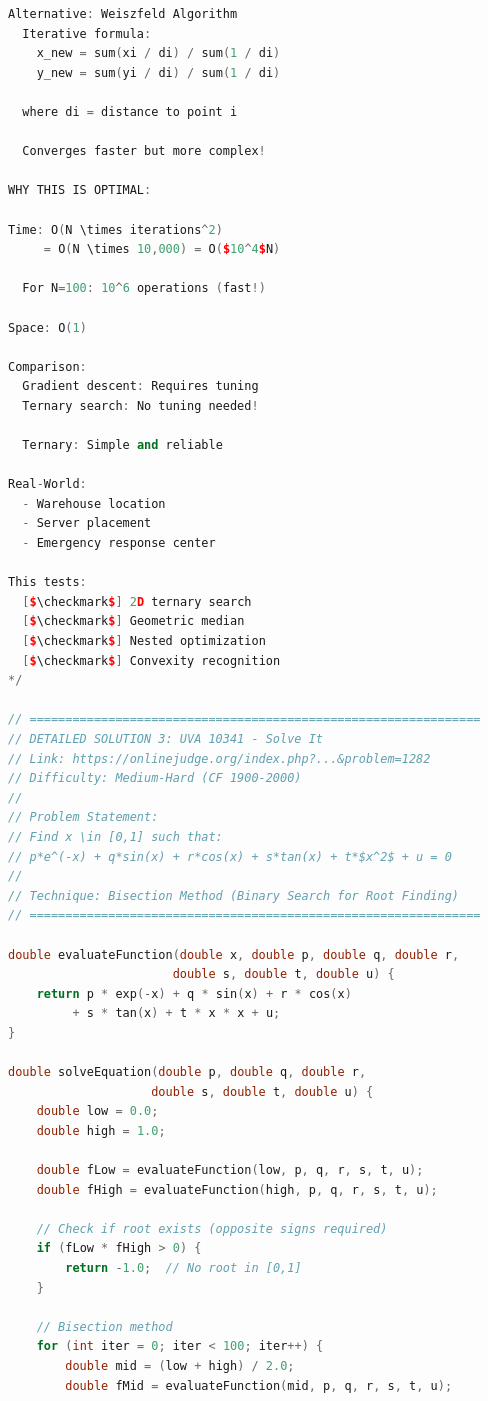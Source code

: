 \documentclass[11pt,a4paper,oneside]{book}
\begin{document}
\begin{lstlisting}[language=C++, caption=COMPLETE Coordinate BS Solutions - DETAILED]
Alternative: Weiszfeld Algorithm
  Iterative formula:
    x_new = sum(xi / di) / sum(1 / di)
    y_new = sum(yi / di) / sum(1 / di)
  
  where di = distance to point i
  
  Converges faster but more complex!

WHY THIS IS OPTIMAL:

Time: O(N \times iterations^2)
     = O(N \times 10,000) = O($10^4$N)
  
  For N=100: 10^6 operations (fast!)

Space: O(1)

Comparison:
  Gradient descent: Requires tuning
  Ternary search: No tuning needed!
  
  Ternary: Simple and reliable

Real-World:
  - Warehouse location
  - Server placement
  - Emergency response center

This tests:
  [$\checkmark$] 2D ternary search
  [$\checkmark$] Geometric median
  [$\checkmark$] Nested optimization
  [$\checkmark$] Convexity recognition
*/

// ===============================================================
// DETAILED SOLUTION 3: UVA 10341 - Solve It
// Link: https://onlinejudge.org/index.php?...&problem=1282
// Difficulty: Medium-Hard (CF 1900-2000)
//
// Problem Statement:
// Find x \in [0,1] such that:
// p*e^(-x) + q*sin(x) + r*cos(x) + s*tan(x) + t*$x^2$ + u = 0
//
// Technique: Bisection Method (Binary Search for Root Finding)
// ===============================================================

double evaluateFunction(double x, double p, double q, double r, 
                       double s, double t, double u) {
    return p * exp(-x) + q * sin(x) + r * cos(x) 
         + s * tan(x) + t * x * x + u;
}

double solveEquation(double p, double q, double r, 
                    double s, double t, double u) {
    double low = 0.0;
    double high = 1.0;
    
    double fLow = evaluateFunction(low, p, q, r, s, t, u);
    double fHigh = evaluateFunction(high, p, q, r, s, t, u);
    
    // Check if root exists (opposite signs required)
    if (fLow * fHigh > 0) {
        return -1.0;  // No root in [0,1]
    }
    
    // Bisection method
    for (int iter = 0; iter < 100; iter++) {
        double mid = (low + high) / 2.0;
        double fMid = evaluateFunction(mid, p, q, r, s, t, u);
        

\end{lstlisting}
\end{document}

